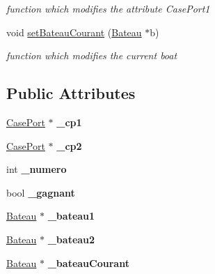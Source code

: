 \begin{DoxyCompactItemize}
\begin{DoxyCompactList}\small\item\em function which modifies the attribute CasePort1 \item\end{DoxyCompactList}\item 
\hypertarget{class_joueur_a4a2585b5295e9ae18b2cbb21f18c562c}{
void \hyperlink{class_joueur_a4a2585b5295e9ae18b2cbb21f18c562c}{setBateauCourant} (\hyperlink{class_bateau}{Bateau} $\ast$b)}
\label{class_joueur_a4a2585b5295e9ae18b2cbb21f18c562c}

\begin{DoxyCompactList}\small\item\em function which modifies the current boat \item\end{DoxyCompactList}\end{DoxyCompactItemize}
\subsection*{Public Attributes}
\begin{DoxyCompactItemize}
\item 
\hypertarget{class_joueur_af0de4442f70bf248951e1db9a0cfe077}{
\hyperlink{class_case_port}{CasePort} $\ast$ {\bfseries \_\-cp1}}
\label{class_joueur_af0de4442f70bf248951e1db9a0cfe077}

\item 
\hypertarget{class_joueur_a8400f914c3f91e5a9ec6a973ea7fa1ef}{
\hyperlink{class_case_port}{CasePort} $\ast$ {\bfseries \_\-cp2}}
\label{class_joueur_a8400f914c3f91e5a9ec6a973ea7fa1ef}

\item 
\hypertarget{class_joueur_aa0ad65e1971ff00f9c391194cd6ed913}{
int {\bfseries \_\-numero}}
\label{class_joueur_aa0ad65e1971ff00f9c391194cd6ed913}

\item 
\hypertarget{class_joueur_a65d2930fd5c5e1c029aa8c0d69c0d9a7}{
bool {\bfseries \_\-gagnant}}
\label{class_joueur_a65d2930fd5c5e1c029aa8c0d69c0d9a7}

\item 
\hypertarget{class_joueur_aed2e49231a720cfbd55ff308f8147c1b}{
\hyperlink{class_bateau}{Bateau} $\ast$ {\bfseries \_\-bateau1}}
\label{class_joueur_aed2e49231a720cfbd55ff308f8147c1b}

\item 
\hypertarget{class_joueur_a17b76e11b553febefb4bc4e0e8906128}{
\hyperlink{class_bateau}{Bateau} $\ast$ {\bfseries \_\-bateau2}}
\label{class_joueur_a17b76e11b553febefb4bc4e0e8906128}

\item 
\hypertarget{class_joueur_adf857673b7cf479bb50e70b08e76c51c}{
\hyperlink{class_bateau}{Bateau} $\ast$ {\bfseries \_\-bateauCourant}}
\label{class_joueur_adf857673b7cf479bb50e70b08e76c51c}

\end{DoxyCompactItemize}


